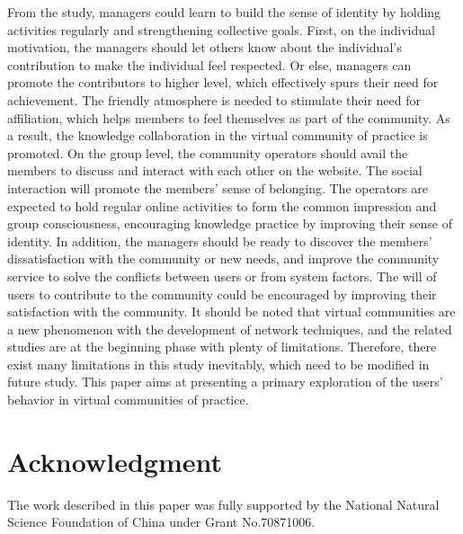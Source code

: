 \documentclass{elsarticle}
\begin{document}
From the study, managers could learn to build the sense of identity by holding activities regularly and strengthening collective goals. First, on the individual motivation, the managers should let others know about the individual’s contribution to make the individual feel respected. Or else, managers can promote the contributors to higher level, which effectively spurs their need for achievement. The friendly atmosphere is needed to stimulate their need for affiliation, which helps members to feel themselves as part of the community. As a result, the knowledge collaboration in the virtual community of practice is promoted. On the group level, the community operators should avail the members to discuss and interact with each other on the website. The social interaction will promote the members’ sense of belonging. The operators are expected to hold regular online activities to form the common impression and group consciousness, encouraging knowledge practice by improving their sense of identity. In addition, the managers should be ready to discover the members’ dissatisfaction with the community or new needs, and improve the community service to solve the conflicts between users or from system factors. The will of users to contribute to the community could be encouraged by improving their satisfaction with the community. 
It should be noted that virtual communities are a new phenomenon with
the development of network techniques, and the related studies are at
the beginning phase with plenty of limitations. Therefore, there exist
many limitations in this study inevitably, which need to be modified
in future study. This paper aims at presenting a primary exploration
of the users’ behavior in virtual communities of practice. 

\section{Acknowledgment}
\label{sec:acknowledgment}

The work described in this paper was fully supported by the National Natural
Science Foundation of China under Grant No.70871006.


 
\end{document}

